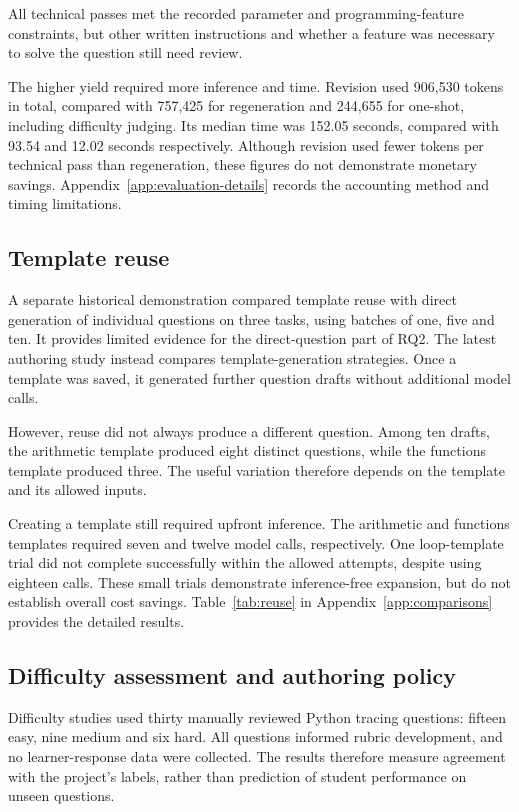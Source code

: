 All technical passes met the recorded parameter and programming-feature constraints, but other written instructions and whether a feature was necessary to solve the question still need review.

The higher yield required more inference and time. Revision used 906,530 tokens in total, compared with 757,425 for regeneration and 244,655 for one-shot, including difficulty judging. Its median time was 152.05 seconds, compared with 93.54 and 12.02 seconds respectively. Although revision used fewer tokens per technical pass than regeneration, these figures do not demonstrate monetary savings. Appendix~\ref{app:evaluation-details} records the accounting method and timing limitations.

\subsection{Template reuse}\label{sec:reuse}

A separate historical demonstration compared template reuse with direct generation of individual questions on three tasks, using batches of one, five and ten. It provides limited evidence for the direct-question part of RQ2. The latest authoring study instead compares template-generation strategies. Once a template was saved, it generated further question drafts without additional model calls.

However, reuse did not always produce a different question. Among ten drafts, the arithmetic template produced eight distinct questions, while the functions template produced three. The useful variation therefore depends on the template and its allowed inputs.

Creating a template still required upfront inference. The arithmetic and functions templates required seven and twelve model calls, respectively. One loop-template trial did not complete successfully within the allowed attempts, despite using eighteen calls. These small trials demonstrate inference-free expansion, but do not establish overall cost savings. Table~\ref{tab:reuse} in Appendix~\ref{app:comparisons} provides the detailed results.
\subsection{Difficulty assessment and authoring policy}\label{sec:difficulty-results}

Difficulty studies used thirty manually reviewed Python tracing questions: fifteen easy, nine medium and six hard. All questions informed rubric development, and no learner-response data were collected. The results therefore measure agreement with the project's labels, rather than prediction of student performance on unseen questions.

